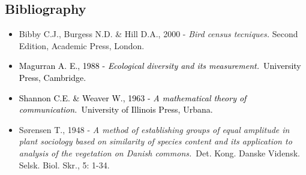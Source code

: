\begin{otherlanguage}{english}
\section*{Bibliography}
\begin{itemize}\itemsep0pt
	\item Bibby C.J., Burgess N.D. \& Hill D.A., 2000 - \textit{Bird census tecniques.} Second Edition, Academic Press, London.
	\item \textcolor{black}{Magurran A. E., 1988 - }\textit{\textcolor{black}{Ecological diversity and its
measurement.}}\textcolor{black}{\ University Press, Cambridge.}
	\item \textcolor{black}{Shannon C.E. \& Weaver W., 1963 - }\textit{\textcolor{black}{A mathematical theory of
communication.}}\textcolor{black}{\ University of Illinois Press, Urbana.}
	\item S{\o}rensen T., 1948 - \textit{A method of establishing groups of equal amplitude in plant sociology based on similarity of species content and its application to analysis of the vegetation on Danish commons.}\ Det. Kong. Danske Vidensk. Selsk. Biol. Skr., 5: 1-34.
\end{itemize}
\end{otherlanguage}